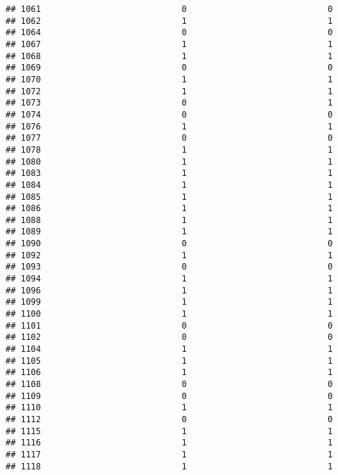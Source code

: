 \documentclass[
]{article}
\begin{document}
\begin{verbatim}
## 1061                            0                            0
## 1062                            1                            1
## 1064                            0                            0
## 1067                            1                            1
## 1068                            1                            1
## 1069                            0                            0
## 1070                            1                            1
## 1072                            1                            1
## 1073                            0                            1
## 1074                            0                            0
## 1076                            1                            1
## 1077                            0                            0
## 1078                            1                            1
## 1080                            1                            1
## 1083                            1                            1
## 1084                            1                            1
## 1085                            1                            1
## 1086                            1                            1
## 1088                            1                            1
## 1089                            1                            1
## 1090                            0                            0
## 1092                            1                            1
## 1093                            0                            0
## 1094                            1                            1
## 1096                            1                            1
## 1099                            1                            1
## 1100                            1                            1
## 1101                            0                            0
## 1102                            0                            0
## 1104                            1                            1
## 1105                            1                            1
## 1106                            1                            1
## 1108                            0                            0
## 1109                            0                            0
## 1110                            1                            1
## 1112                            0                            0
## 1115                            1                            1
## 1116                            1                            1
## 1117                            1                            1
## 1118                            1                            1

\end{verbatim}
\end{document}
